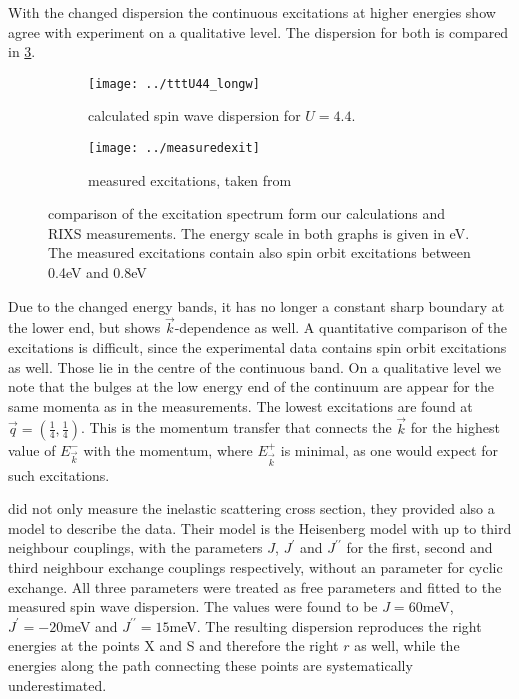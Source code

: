 With the changed dispersion the continuous excitations at higher energies show agree with experiment on a qualitative level. 
The dispersion for both is compared in \ref{continuum}.
\begin{figure}
 \centering
 \begin{subfigure}{0.49\linewidth}
  \texttt{[image: ../tttU44\_longw]}
  \caption{calculated spin wave dispersion for $U=4.4$.}
  \label{tttU44_longw}
 \end{subfigure}
\begin{subfigure}{.49\linewidth}
 \texttt{[image: ../measuredexit]}
 \caption{measured excitations, taken from \cite{PhysRevLett.108.177003} }
 \label{experimental_longw}
\end{subfigure}
\caption{comparison of the excitation spectrum  form our calculations and RIXS measurements. The energy scale in both graphs is given in eV. 
	  The measured excitations contain also spin orbit excitations between 0.4eV and 0.8eV}
\label{continuum}	  
\end{figure}
Due to the changed energy bands, it has no longer a constant sharp boundary at the lower end, but shows $\vec k$-dependence as well.
A quantitative comparison of the excitations is difficult, since the experimental data contains  spin orbit excitations as well. Those lie in the centre 
of the continuous band.
On a qualitative level we note that the bulges at the low energy end of the continuum are appear for the same momenta as in the measurements. 
The lowest excitations are found at $\vec q = (\frac14,\frac14)$. This is the momentum transfer that connects the $\vec k$ for the highest value of $E^-_{\vec k}$ with the 
momentum, where $E^+_{\vec k}$ is minimal, as one would expect for such excitations.








\citet{PhysRevLett.108.177003} did not only measure the inelastic scattering cross section, they provided also a model to describe the data.
Their model is the Heisenberg model with up to third neighbour couplings, with the parameters $J$, $J^{\prime}$ and $J^{\prime \prime}$ for
the first, second and third neighbour exchange couplings respectively, without an parameter for cyclic exchange. 
All three parameters were treated as free parameters and fitted to the measured spin wave dispersion. 
The values were found to be $J=60$meV, $J^{\prime}=-20$meV and $J^{\prime\prime}=15$meV. 
The resulting dispersion reproduces the right energies at the points X and S and therefore the right $r$ as well,
while the energies along the path connecting these points are systematically underestimated.



